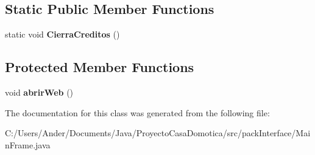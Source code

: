 \subsection*{Static Public Member Functions}
\begin{DoxyCompactItemize}
\item 
\mbox{\label{classpack_interface_1_1_main_frame_a0540256548b21e4573e070db23bdce88}} 
static void {\bfseries Cierra\+Creditos} ()
\end{DoxyCompactItemize}
\subsection*{Protected Member Functions}
\begin{DoxyCompactItemize}
\item 
\mbox{\label{classpack_interface_1_1_main_frame_aa90e27d66e1f9e3eaae6a79d81f34b61}} 
void {\bfseries abrir\+Web} ()
\end{DoxyCompactItemize}


The documentation for this class was generated from the following file\+:\begin{DoxyCompactItemize}
\item 
C\+:/\+Users/\+Ander/\+Documents/\+Java/\+Proyecto\+Casa\+Domotica/src/pack\+Interface/Main\+Frame.\+java\end{DoxyCompactItemize}
